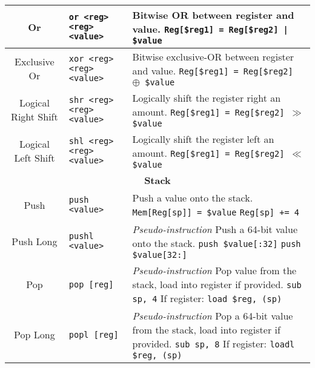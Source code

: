 \documentclass{article}
\begin{document}
\begin{longtable}{|c|l|l|}
    \hline
    Or & \texttt{or <reg> <reg> <value>} & \makecell[l]{Bitwise OR between register and value.\\%
    \texttt{Reg[\$reg1] = Reg[\$reg2] | \$value}} \\
    \hline
    Exclusive Or & \texttt{xor <reg> <reg> <value>} & \makecell[l]{Bitwise exclusive-OR between register and value.\\%
    \texttt{Reg[\$reg1] = Reg[\$reg2] \(\oplus\) \$value}} \\
    \hline
    Logical Right Shift & \texttt{shr <reg> <reg> <value>} & \makecell[l]{Logically shift the register right an amount.\\%
    \texttt{Reg[\$reg1] = Reg[\$reg2] \(\gg\) \$value}} \\
    \hline
    Logical Left Shift & \texttt{shl <reg> <reg> <value>} & \makecell[l]{Logically shift the register left an amount.\\%
    \texttt{Reg[\$reg1] = Reg[\$reg2] \(\ll\) \$value}} \\
    \hline \hline
    \multicolumn{3}{|c|}{\textbf{Stack}} \\
    \hline
    Push & \texttt{push <value>} & \makecell[l]{Push a value onto the stack.\\%
    \texttt{Mem[Reg[sp]] = \$value}\\%
    \texttt{Reg[sp] += 4}} \\
    \hline
    Push Long & \texttt{pushl <value>} & \makecell[l]{\textit{Pseudo-instruction}\\%
    Push a 64-bit value onto the stack.\\%
    \texttt{push \$value[:32]}\\%
    \texttt{push \$value[32:]}} \\
    \hline
    Pop & \texttt{pop [reg]} & \makecell[l]{\textit{Pseudo-instruction}\\%
    Pop value from the stack, load into register if provided.\\%
    \texttt{sub sp, 4}\\%
    If register: \texttt{load \$reg, (sp)}} \\
    \hline
    Pop Long & \texttt{popl [reg]} & \makecell[l]{\textit{Pseudo-instruction}\\%
    Pop a 64-bit value from the stack, load into register if provided.\\%
    \texttt{sub sp, 8}\\%
    If register: \texttt{loadl \$reg, (sp)}} \\
    \hline \hline

\end{longtable}
\end{document}
